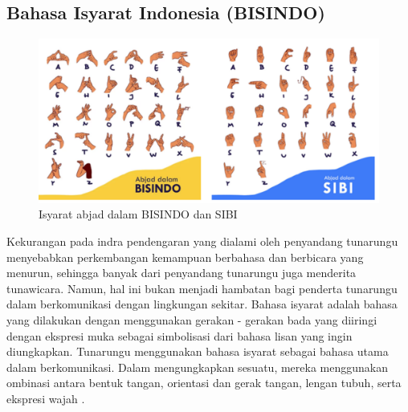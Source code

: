 \subsection{Bahasa Isyarat Indonesia (BISINDO)}
\begin{figure}[H]
    \centering

    \includegraphics[scale=0.6]{gambar/bab2-isyarat-indonesia.png}
 
    \caption{Isyarat abjad dalam BISINDO dan SIBI}
    \label{fig:isyaratindonesia}
\end{figure}

Kekurangan pada indra pendengaran yang dialami oleh penyandang tunarungu menyebabkan perkembangan kemampuan berbahasa dan berbicara yang menurun, sehingga banyak dari penyandang tunarungu juga menderita tunawicara. Namun, hal ini bukan menjadi hambatan bagi penderta tunarungu dalam berkomunikasi dengan lingkungan sekitar. Bahasa isyarat adalah bahasa yang dilakukan dengan menggunakan gerakan - gerakan bada yang diiringi dengan ekspresi muka sebagai simbolisasi dari bahasa lisan yang ingin diungkapkan. Tunarungu menggunakan bahasa isyarat sebagai bahasa utama dalam berkomunikasi. Dalam mengungkapkan sesuatu, mereka menggunakan ombinasi antara bentuk tangan, orientasi dan gerak tangan, lengan tubuh, serta ekspresi wajah \parencite{mursita2015}.

